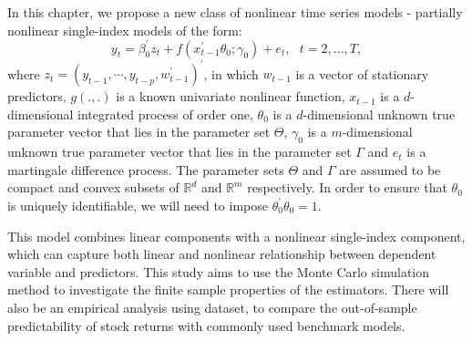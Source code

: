 \documentclass[a4paper,12pt,times,numbered,print,index]{report}
\numberwithin{equation}{section}
\begin{document}

In this chapter, we propose a new class of nonlinear time series models - partially nonlinear single-index models of the form:
\begin{equation}
	y_{t} = \beta_0^{\prime} z_t + f\left( x_{t-1}^{\prime }\theta_0; \gamma_0\right) +e_{t},\ \ \
	t=2,...,T,  
	\label{PL model}
\end{equation}%
where $z_t = (y_{t-1}, \cdots, y_{t-p}, w_{t-1}^{\prime})^{\prime}$, in which $w_{t-1}$ is a vector of stationary predictors, 
$g\left( .,.\right) $ is a known univariate nonlinear function, $x_{t-1}$ is a $d$-dimensional integrated process of order one, $\theta _{0}$ is a $d$-dimensional unknown true parameter vector that lies in the parameter set $\Theta $, $\gamma _{0}$ is a $m$-dimensional unknown true parameter vector that lies in the parameter set $\Gamma $ and $e_{t}$ is a martingale
difference process. The parameter sets $\Theta $ and $\Gamma $ are assumed to be compact and convex subsets of $\mathbb{R}^{d}$ and $\mathbb{R}^{m}$ respectively. In order to ensure that $\theta_0$ is uniquely identifiable, we will need to impose $\theta_{0}^{\prime}\theta_{0} = 1$. 

This model combines linear components with a nonlinear single-index component, which can capture both linear and nonlinear relationship between dependent variable and predictors. This study aims to use the Monte Carlo simulation method to investigate the finite sample properties of the estimators. There will also be an empirical analysis using \cite{welch2008comprehensive} dataset, to compare the out-of-sample predictability of stock returns with commonly used benchmark models. 

\end{document}
